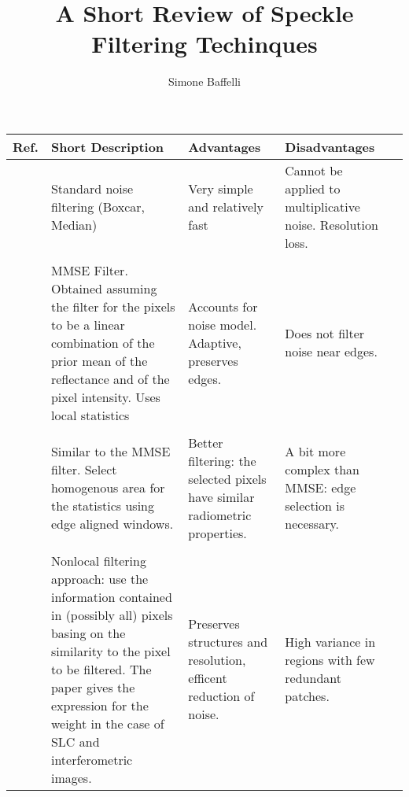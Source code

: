\documentclass[11pt]{article}
\title{\textbf{A Short Review of Speckle Filtering Techinques}}
\author{Simone Baffelli}
\date{}
\begin{document}
	\maketitle
\begin{longtable}{L{1cm}L{5cm}L{3cm}L{3cm}l}
	Ref. & Short Description & Advantages & Disadvantages\\
	\hline
	 &
	Standard noise filtering (Boxcar, Median) &
	Very simple and relatively fast &
	Cannot be applied to multiplicative noise. Resolution loss.\\
	\hline\\
	\cite{Lee1980}& 
	MMSE Filter. Obtained assuming the filter for the pixels to be a linear combination of the prior mean of the reflectance and of the pixel intensity. Uses local statistics&
	Accounts for noise model. Adaptive, preserves edges.&
	Does not filter noise near edges.\\
	\hline\\
	\cite{Lee1981}&
	Similar to the MMSE filter. Select homogenous area for the statistics using edge aligned windows.&
	Better filtering: the selected pixels have similar radiometric properties.&
	A bit more complex than MMSE: edge selection is necessary.\\
	\hline\\
	\cite{Deledalle2010}&
	Nonlocal filtering approach: use the information contained in (possibly all) pixels basing on the similarity to the pixel to be filtered. The paper gives the expression for the weight in the case of SLC and interferometric images.&
	Preserves structures and resolution, efficent reduction of noise.&
	High variance in regions with few redundant patches.
\end{longtable}


{}
\end{document}
